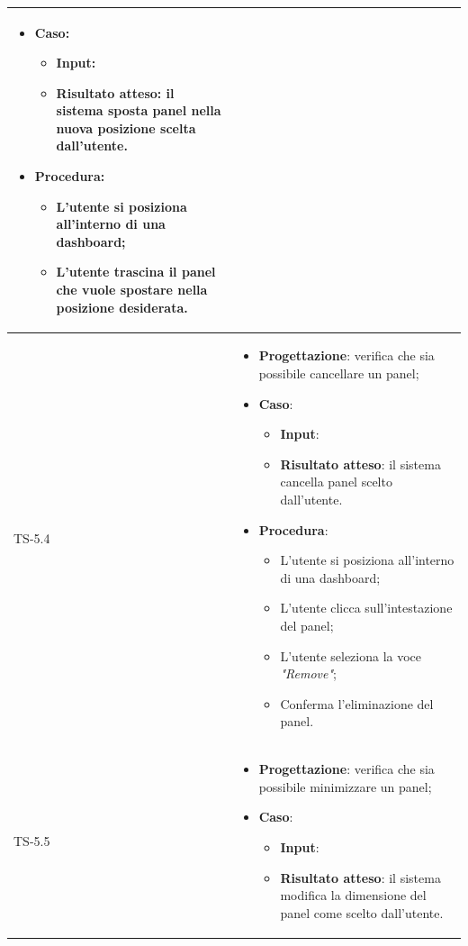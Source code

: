 \begin{longtable}{|C{2.5cm}|C{13cm}|}
\begin{itemize}
	\item \textbf{Caso}: 
	\begin{itemize}
		\item \textbf{Input}: 
		\item \textbf{Risultato atteso}: il sistema sposta panel nella nuova posizione scelta dall'utente.
	\end{itemize}
	\item \textbf{Procedura}:
	\begin{itemize}
		\item L'utente si posiziona all'interno di una dashboard;
		\item L'utente trascina il panel che vuole spostare nella posizione desiderata.
	\end{itemize} 
\end{itemize}
	 \\
	\hline
	{TS-5.4} & 
\begin{itemize}
	\item \textbf{Progettazione}: verifica che sia possibile cancellare un
	panel;
	\item \textbf{Caso}: 
	\begin{itemize}
		\item \textbf{Input}: 
		\item \textbf{Risultato atteso}: il sistema cancella panel scelto dall'utente.
	\end{itemize}
	\item \textbf{Procedura}:
	\begin{itemize}
		\item L'utente si posiziona all'interno di una dashboard;
		\item L'utente clicca sull'intestazione del panel;
		\item L'utente seleziona la voce \emph{"Remove"};
		\item Conferma l'eliminazione del panel.
	\end{itemize} 
\end{itemize}
	 \\
	\hline
	{TS-5.5} & 
\begin{itemize}
	\item \textbf{Progettazione}: verifica che sia possibile minimizzare un
	panel;
	\item \textbf{Caso}: 
	\begin{itemize}
		\item \textbf{Input}: 
		\item \textbf{Risultato atteso}: il sistema modifica la dimensione del panel come scelto dall'utente.

\end{itemize}
\end{itemize}
\end{longtable}
